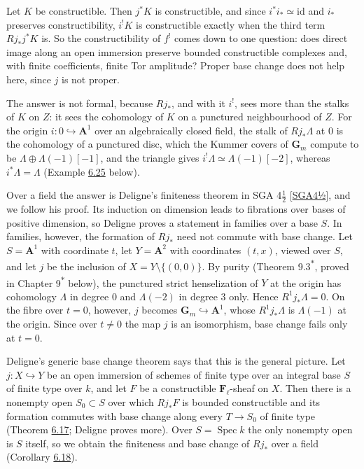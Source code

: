 \documentclass[11pt]{article}
\newcommand{\bpout}[1]{#1\textsuperscript{\hyperlink{bp-outside}{\ensuremath{\ast}}}}
\providecommand{\Fell}{}\renewcommand{\Fell}{\mathbf F_\ell}
\begin{document}
Let \(K\) be constructible. Then \(j^*K\) is constructible, and since \(i^*i_*\simeq\mathrm{id}\) and \(i_*\) preserves constructibility, \(i^!K\) is constructible exactly when the third term \(Rj_*j^*K\) is. So the constructibility of \(f^!\) comes down to one question: does direct image along an open immersion preserve bounded constructible complexes and, with finite coefficients, finite Tor amplitude? Proper base change does not help here, since \(j\) is not proper.

The answer is not formal, because \(Rj_*\), and with it \(i^!\), sees more than the stalks of \(K\) on \(Z\): it sees the cohomology of \(K\) on a punctured neighbourhood of \(Z\). For the origin \(i:0\hookrightarrow\mathbf A^1\) over an algebraically closed field, the stalk of \(Rj_*\Lambda\) at \(0\) is the cohomology of a punctured disc, which the Kummer covers of \(\mathbf G_m\) compute to be \(\Lambda\oplus\Lambda(-1)[-1]\), and the triangle gives \(i^!\Lambda\simeq\Lambda(-1)[-2]\), whereas \(i^*\Lambda=\Lambda\) (Example \hyperref[bp591]{6.25} below).

Over a field the answer is Deligne's finiteness theorem in SGA 4\(\tfrac12\) [\hyperref[bp703]{SGA4½}], and we follow his proof. Its induction on dimension leads to fibrations over bases of positive dimension, so Deligne proves a statement in families over a base \(S\). In families, however, the formation of \(Rj_*\) need not commute with base change. Let \(S=\mathbf A^1\) with coordinate \(t\), let \(Y=\mathbf A^2\) with coordinates \((t,x)\), viewed over \(S\), and let \(j\) be the inclusion of \(X=Y\setminus\{(0,0)\}\). By purity (Theorem \bpout{9.3}, proved in Chapter \bpout{9} below), the punctured strict henselization of \(Y\) at the origin has cohomology \(\Lambda\) in degree \(0\) and \(\Lambda(-2)\) in degree \(3\) only. Hence \(R^1j_*\Lambda=0\). On the fibre over \(t=0\), however, \(j\) becomes \(\mathbf G_m\hookrightarrow\mathbf A^1\), whose \(R^1j_*\Lambda\) is \(\Lambda(-1)\) at the origin. Since over \(t\neq0\) the map \(j\) is an isomorphism, base change fails only at \(t=0\).

Deligne's generic base change theorem says that this is the general picture. Let \(j:X\hookrightarrow Y\) be an open immersion of schemes of finite type over an integral base \(S\) of finite type over \(k\), and let \(F\) be a constructible \(\Fell\)-sheaf on \(X\). Then there is a nonempty open \(S_0\subset S\) over which \(Rj_*F\) is bounded constructible and its formation commutes with base change along every \(T\to S_0\) of finite type (Theorem \hyperref[bp563]{6.17}; Deligne proves more). Over \(S=\operatorname{Spec}k\) the only nonempty open is \(S\) itself, so we obtain the finiteness and base change of \(Rj_*\) over a field (Corollary \hyperref[bp566]{6.18}).
\end{document}
